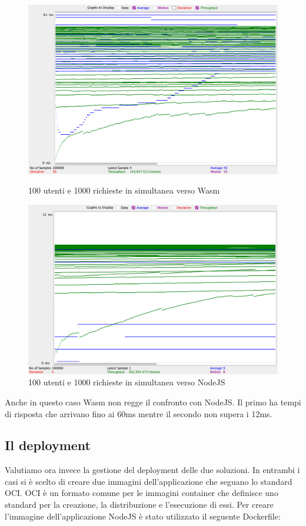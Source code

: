 \begin{figure}[!htb]
        \includegraphics[width=\linewidth]{chapters/3.poc/benchmarks_images/wasi_100_thread_1000_req.png}
        \caption{100 utenti e 1000 richieste in simultanea verso Wasm}\label{fig:100_thread_1000_req_wasi}
    \endminipage\hfill
        \includegraphics[width=\linewidth]{chapters/3.poc/benchmarks_images/node_100_thread_1000_req.png}
        \caption{100 utenti e 1000 richieste in simultanea verso NodeJS}\label{fig:100_thread_1000_req_node}
    \endminipage\hfill
\end{figure}

Anche in questo caso Wasm non regge il confronto con NodeJS. Il primo ha tempi di risposta che arrivano fino ai 60ms
mentre il secondo non supera i 12ms.

\subsection{Il deployment}
Valutiamo ora invece la gestione del deployment delle due soluzioni. In entrambi i casi si è scelto di creare due
immagini dell'applicazione che seguano lo standard OCI. OCI è un formato comune per le immagini container che definisce
uno standard per la creazione, la distribuzione e l'esecuzione di essi. Per creare l'immagine dell'applicazione NodeJS è
stato utilizzato il seguente Dockerfile: 


